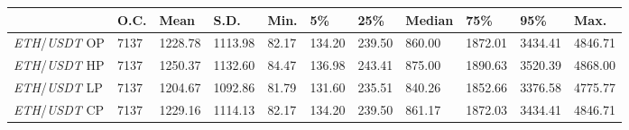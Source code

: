 \begin{tabular}{lllllllllll}
\toprule
 & \textbf{O.C.} & \textbf{Mean} & \textbf{S.D.} & \textbf{Min.} & \textbf{5\%} & \textbf{25\%} & \textbf{Median} & \textbf{75\%} & \textbf{95\%} & \textbf{Max.} \\
\midrule
\emph{ETH}/\emph{USDT} OP & 7137 & 1228.78 & 1113.98 & 82.17 & 134.20 & 239.50 & 860.00 & 1872.01 & 3434.41 & 4846.71 \\
\emph{ETH}/\emph{USDT} HP & 7137 & 1250.37 & 1132.60 & 84.47 & 136.98 & 243.41 & 875.00 & 1890.63 & 3520.39 & 4868.00 \\
\emph{ETH}/\emph{USDT} LP & 7137 & 1204.67 & 1092.86 & 81.79 & 131.60 & 235.51 & 840.26 & 1852.66 & 3376.58 & 4775.77 \\
\emph{ETH}/\emph{USDT} CP & 7137 & 1229.16 & 1114.13 & 82.17 & 134.20 & 239.50 & 861.17 & 1872.03 & 3434.41 & 4846.71 \\
\bottomrule
\end{tabular}
